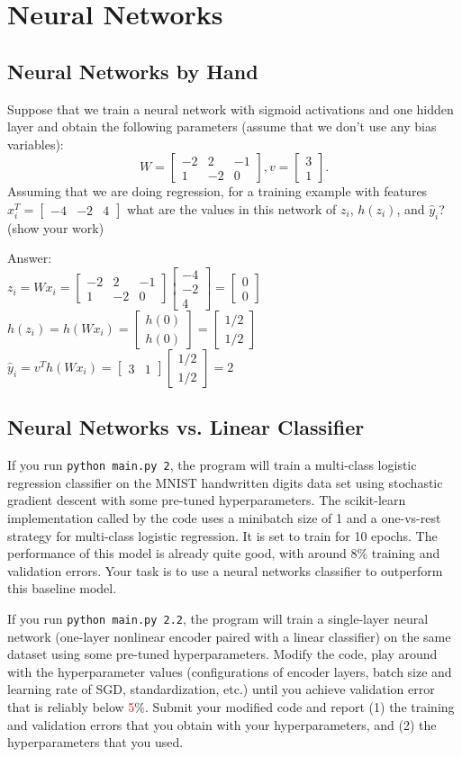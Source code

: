 \documentclass{article}
\newcommand{\blu}[1]{{\textcolor{blu}{#1}}}
\newcommand{\gre}[1]{\textcolor{gre}{#1}}
\newcommand{\red}[1]{\textcolor{red}{#1}}
\newcommand\ans[1]{\par\gre{Answer: #1}}
\let\ask\blu
\newcommand{\mat}[1]{\begin{bmatrix}#1\end{bmatrix}}
\begin{document}
\section{Neural Networks}

\subsection{Neural Networks by Hand}

Suppose that we train a neural network with sigmoid activations and one hidden layer and obtain the following parameters (assume that we don't use any bias variables):
\[
W = \mat{-2 & 2 & -1\\1 & -2 & 0}, v = \mat{3 \\1}.
\]
\ask{Assuming that we are doing regression, for a training example with features $x_i^T = \mat{-4 &-2 & 4}$ what are the values in this network of $z_i$, $h(z_i)$, and $\hat{y}_i$? (show your work)}
\ans{\\
$z_i = Wx_i = \mat{-2 & 2 & -1\\1 & -2 & 0}\mat{-4 \\-2 \\ 4} = \mat{0 \\ 0}$ 
\\
$h(z_i) = h(Wx_i) = \mat{h(0) \\ h(0)} = \mat{1/2 \\ 1/2}$
\\
$\hat{y}_i = v^Th(Wx_i) = \mat{3 & 1}\mat{1/2 \\ 1/2} = 2$
}

\subsection{Neural Networks vs. Linear Classifier}

If you run \texttt{python main.py 2}, the program will train a multi-class logistic regression classifier on the MNIST handwritten digits data set using stochastic gradient descent with some pre-tuned hyperparameters.
The scikit-learn implementation called by the code uses a minibatch size of 1 and a one-vs-rest strategy for multi-class logistic regression. It is set to train for 10 epochs.
The performance of this model is already quite good, with around 8\% training and validation errors. Your task is to use a neural networks classifier to outperform this baseline model.

If you run \texttt{python main.py 2.2}, the program will train a single-layer neural network (one-layer nonlinear encoder paired with a linear classifier) on the same dataset using some pre-tuned hyperparameters. Modify the code, play around with the hyperparameter values (configurations of encoder layers, batch size and learning rate of SGD, standardization, etc.) until you achieve validation error that is reliably below \red{5}\%. \ask{Submit your modified code and report (1) the training and validation errors that you obtain with your hyperparameters, and (2) the hyperparameters that you used.}
\end{document}
